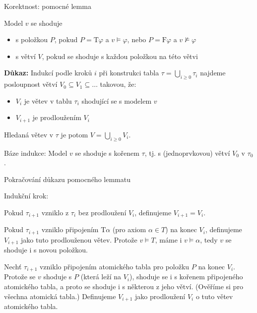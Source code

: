 \documentclass{beamer}
\begin{document}
\begin{frame}{Korektnost: pomocné lemma}


    Model $v$ se \alert{shoduje}
    \begin{itemize}
        \item \alert{s položkou $P$}, pokud
        $P=\mathrm{T}\varphi$ a $v\models\varphi$, nebo $P=\mathrm{F}\varphi$ a $v\not\models\varphi$
        \item \alert{s větví $V$}, pokud se shoduje s každou položkou na této větvi
    \end{itemize}
    
    \medskip


    \smallskip
    
    \textbf{Důkaz:}
    Indukcí podle kroků $i$ při konstrukci tabla $\tau=\bigcup_{i\geq 0}\tau_i$ najdeme posloupnost větví $V_0\subseteq V_1\subseteq\dots$ takovou, že:
     \begin{itemize}
        \item $V_i$ je větev v tablu $\tau_i$ shodující se s modelem $v$
        \item $V_{i+1}$ je prodloužením $V_i$
     \end{itemize}
    Hledaná větev v $\tau$ je potom $V=\bigcup_{i\geq 0}V_i$.
    
    \alert{Báze indukce:} Model $v$ se shoduje s kořenem $\tau$, tj. s (jednoprvkovou) větví $V_0$ v $\tau_0$.

\end{frame}


\begin{frame}{Pokračování důkazu pomocného lemmatu}

    \alert{Indukční krok:}
    
    Pokud $\tau_{i+1}$ vzniklo z $\tau_i$ bez prodloužení $V_i$, definujeme $V_{i+1}=V_i$.

    \medskip

    Pokud $\tau_{i+1}$ vzniklo připojením $\mathrm{T}\alpha$ (pro axiom $\alpha\in T$) na konec $V_i$, definujeme $V_{i+1}$ jako tuto prodlouženou větev. Protože $v\models T$, máme i $v\models\alpha$, tedy $v$ se shoduje i s novou položkou.
    
    \medskip

     Nechť $\tau_{i+1}$ vzniklo připojením atomického tabla pro položku $P$ na konec $V_i$. Protože se $v$ shoduje s $P$ (která leží na $V_i$), shoduje se i s kořenem připojeného atomického tabla, a proto se shoduje i s některou z jeho větví. (Ověříme si pro všechna atomická tabla.) Definujeme $V_{i+1}$ jako prodloužení $V_i$ o tuto větev atomického tabla.\hfill\qedsymbol

\end{frame}
\end{document}
